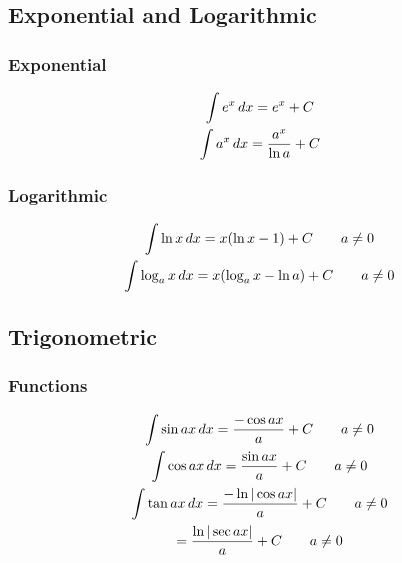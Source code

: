 \documentclass[12pt]{article}
\begin{document}
		\subsection{Exponential and Logarithmic}
			\subsubsection{Exponential}
				\begin{gather}
					\int e^x\,dx = e^x + C \\
					\int a^x\,dx = \frac{a^x}{\ln a} + C
				\end{gather}
			\subsubsection{Logarithmic}
				\begin{gather}
					\int \ln x\,dx = x(\ln x - 1) + C
					\qquad a \neq 0 \\
					\int \log_ax\,dx = x(\log_ax - \ln a) +
					C \qquad a \neq 0
				\end{gather}
		\subsection{Trigonometric}
			\subsubsection{Functions}
				\begin{gather}
					\int \sin ax\,dx = \frac{-\cos ax}{a} +
					C \qquad a \neq 0 \\
					\int \cos ax\,dx = \frac{\sin ax}{a} +
					C \qquad a \neq 0 \\
					\int \tan ax\,dx = \frac{-\ln |\cos
					ax|}{a} + C \qquad a \neq 0 \\
					= \frac{\ln |\sec ax|}{a} + C \qquad a
					\neq 0
				\end{gather}
\end{document}

